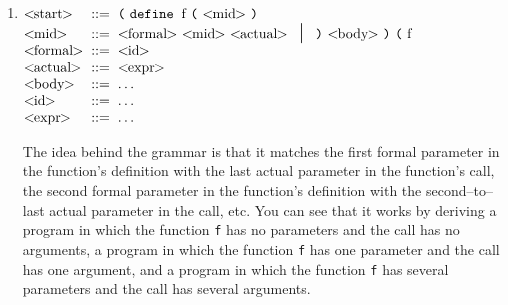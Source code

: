 \documentclass[11pt]{article}
\begin{document}
\begin{enumerate}
\begin{enumerate}
            \item \(
                    \begin{array}[t]{@{}l@{\hspace{2mm}}l@{\hspace{2mm}}l}
                      \NT{start}
                        & ::=
                        & \mathtt{\texttt{(} \ define \ \: \textrm{f} \
                          \texttt{(} \ \NT{mid} \ \texttt{)}}
                        \\
                      \NT{mid}
                        & ::=
                        & \mathtt{\NT{formal} \ \NT{mid} \ \NT{actual} \
                          \midspc \ \texttt{)} \ \NT{body} \ \texttt{)} \
                          \texttt{(} \ \mathrm{f}}
                        \\
                      \NT{formal}
                        & ::=
                        & \NT{id}
                        \\
                      \NT{actual}
                        & ::=
                        & \NT{expr}
                        \\
                      \NT{body}
                        & ::=
                        & \ldots
                        \\
                      \NT{id}
                        & ::=
                        & \ldots
                        \\
                      \NT{expr}
                        & ::=
                        & \ldots
                        \\
                    \end{array}
                  \)

                  \medskip

                  The idea behind the grammar is that it matches the first
                  formal parameter in the function's definition with the
                  last actual parameter in the function's call, the second
                  formal parameter in the function's definition with the
                  second--to--last actual parameter in the call, etc.  You
                  can see that it works by deriving a program in which the
                  function \texttt{f} has no parameters and the call has no
                  arguments, a program in which the function \texttt{f} has
                  one parameter and the call has one argument, and a program
                  in which the function \texttt{f} has several parameters
                  and the call has several arguments.


\end{enumerate}
\end{enumerate}
\end{document}
